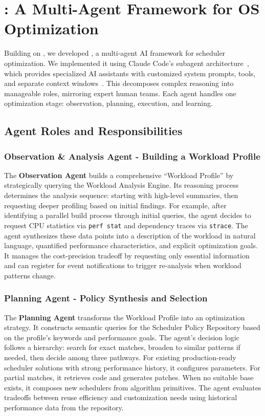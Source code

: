 \section{\agent: A Multi-Agent Framework for OS Optimization}
\label{sec:sched_agents}

Building on \sys, we developed \textbf{\agent}, a multi-agent AI framework for scheduler optimization. We implemented it using Claude Code's subagent architecture~\cite{anthropic2024subagents}, which provides specialized AI assistants with customized system prompts, tools, and separate context windows~\cite{anthropic2024multiagent}. This decomposes complex reasoning into manageable roles, mirroring expert human teams. Each agent handles one optimization stage: observation, planning, execution, and learning.

\subsection{Agent Roles and Responsibilities}

\subsubsection{Observation \& Analysis Agent - Building a Workload Profile}

The \textbf{Observation Agent} builds a comprehensive ``Workload Profile'' by strategically querying the Workload Analysis Engine. Its reasoning process determines the analysis sequence: starting with high-level summaries, then requesting deeper profiling based on initial findings. For example, after identifying a parallel build process through initial queries, the agent decides to request CPU statistics via \texttt{perf stat} and dependency traces via \texttt{strace}. The agent synthesizes these data points into a description of the workload in natural language, quantified performance characteristics, and explicit optimization goals. It manages the cost-precision tradeoff by requesting only essential information and can register for event notifications to trigger re-analysis when workload patterns change.

\subsubsection{Planning Agent - Policy Synthesis and Selection}

The \textbf{Planning Agent} transforms the Workload Profile into an optimization strategy. It constructs semantic queries for the Scheduler Policy Repository based on the profile's keywords and performance goals. The agent's decision logic follows a hierarchy: search for exact matches, broaden to similar patterns if needed, then decide among three pathways. For existing production-ready scheduler solutions with strong performance history, it configures parameters. For partial matches, it retrieves code and generates patches. When no suitable base exists, it composes new schedulers from algorithm primitives. The agent evaluates tradeoffs between reuse efficiency and customization needs using historical performance data from the repository.

